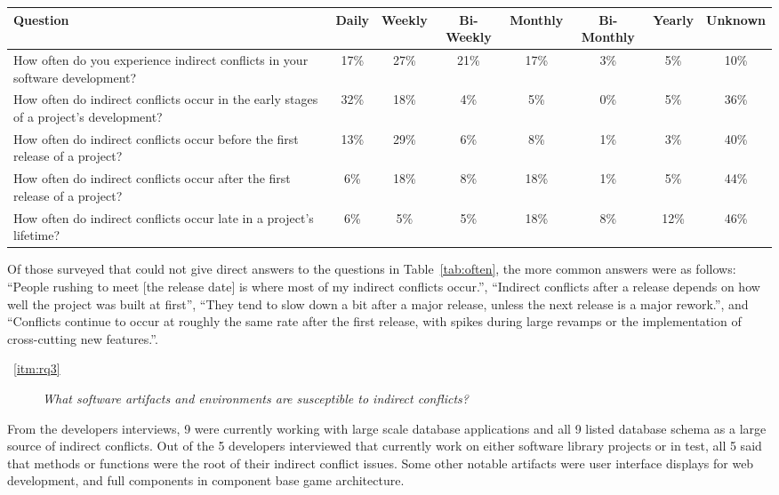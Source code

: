 \documentclass[conference]{IEEEtran}
\begin{document}
\begin{table*}[tb!]
\begin{center}
\begin{tabular}{| p{7cm} | c | c | c | c | c | c | c |}
\hline
Question & Daily & Weekly & Bi-Weekly & Monthly & Bi-Monthly & Yearly & Unknown \\
\hline
\hline
How often do you experience indirect conflicts in your software development? & 17\% & 27\% & 21\% & 17\% & 3\% & 5\% & 10\% \\ \hline
How often do indirect conflicts occur in the early stages of a project’s development? & 32\% & 18\% & 4\% & 5\% & 0\% & 5\% & 36\% \\ \hline
How often do indirect conflicts occur before the first release of a project? & 13\% & 29\% & 6\% & 8\% & 1\% & 3\% & 40\% \\ \hline
How often do indirect conflicts occur after the first release of a project? & 6\% & 18\% & 8\% & 18\% & 1\% & 5\% & 44\% \\ \hline
How often do indirect conflicts occur late in a project’s lifetime? & 6\% & 5\% & 5\% & 18\% & 8\% & 12\% & 46\% \\ \hline
\end{tabular}
\end{center}
\caption{Results of survey questions to how often indirect conflicts occur, in terms of percentage
of developers surveyed.\label{tab:often}}
\end{table*}

Of those surveyed that could not give direct answers to the questions in Table~\ref{tab:often}, the more common answers were 
as follows: ``People rushing to meet [the release date] is where most of my indirect conflicts occur.'', ``Indirect conflicts
after a release depends on how well the project was built at first'', ``They tend to slow down a bit after a major release, 
unless the next release is a major rework.'', and ``Conflicts continue to occur at roughly the same rate after the first release,
with spikes during large revamps or the implementation of cross-cutting new features.''.

\begin{description}
	\item[~\ref{itm:rq3}] \textit{What software artifacts and environments are susceptible to indirect conflicts?}
\end{description}

From the developers interviews, 9 were currently working with large scale database applications and all 9 listed database
schema as a large source of indirect conflicts. Out of the 5 developers interviewed that currently work on either software
library projects or in test, all 5 said that methods or functions were the root of their indirect conflict issues. Some
other notable artifacts were user interface displays for web development, and full components in component base game
architecture. 
\end{document}
